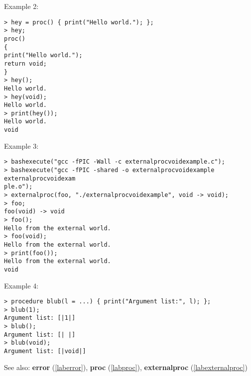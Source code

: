 \noindent Example 2: 
\begin{center}\begin{minipage}{15cm}\begin{Verbatim}[frame=single]
> hey = proc() { print("Hello world."); };
> hey;
proc()
{
print("Hello world.");
return void;
}
> hey();
Hello world.
> hey(void);
Hello world.
> print(hey());
Hello world.
void
\end{Verbatim}
\end{minipage}\end{center}
\noindent Example 3: 
\begin{center}\begin{minipage}{15cm}\begin{Verbatim}[frame=single]
> bashexecute("gcc -fPIC -Wall -c externalprocvoidexample.c");
> bashexecute("gcc -fPIC -shared -o externalprocvoidexample externalprocvoidexam
ple.o");
> externalproc(foo, "./externalprocvoidexample", void -> void);
> foo;
foo(void) -> void
> foo();
Hello from the external world.
> foo(void);
Hello from the external world.
> print(foo());
Hello from the external world.
void
\end{Verbatim}
\end{minipage}\end{center}
\noindent Example 4: 
\begin{center}\begin{minipage}{15cm}\begin{Verbatim}[frame=single]
> procedure blub(l = ...) { print("Argument list:", l); };
> blub(1);
Argument list: [|1|]
> blub();
Argument list: [| |]
> blub(void); 
Argument list: [|void|]
\end{Verbatim}
\end{minipage}\end{center}
See also: \textbf{error} (\ref{laberror}), \textbf{proc} (\ref{labproc}), \textbf{externalproc} (\ref{labexternalproc})
